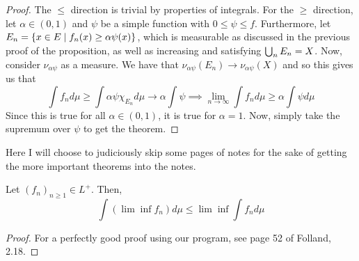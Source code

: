 \documentclass[11pt,leqno,oneside]{amsbook}
\numberwithin{thm}{section}
\begin{document}
\begin{proof}
  The \(\leq\) direction is trivial by properties of integrals. For
  the \(\geq\) direction, let \(\alpha \in (0,1)\) and \(\psi\) be 
  a simple function with \(0 \leq \psi \leq f\). Furthermore, let
  \(E_n = \{x \in E \mid f_n(x) \geq \alpha \psi(x)\}\), which is
  measurable as discussed in the previous proof of the proposition, as
  well as increasing and satisfying \(\bigcup_n E_n = X\). Now,
  consider \(\nu_{\alpha \psi}\) as a measure. We have that
  \(\nu_{\alpha \psi}(E_n) \to \nu_{\alpha \psi}(X)\) and so this
  gives us that \[
    \int f_n d\mu \geq \int \alpha \psi \chi_{E_n} d\mu \to \alpha
    \int \psi \implies \lim_{n \to \infty} \int f_n d\mu \geq \alpha
    \int \psi d\mu
  \]
  Since this is true for all \(\alpha \in (0,1)\), it is true for
  \(\alpha = 1\). Now, simply take the supremum over \(\psi\) to get
  the theorem.
\end{proof}
Here I will choose to judiciously skip some pages of notes for the
sake of getting the more important theorems into the notes.
\begin{lem}
  Let \((f_n)_{n \geq 1} \in L^+\). Then, \[
    \int (\lim \inf f_n) d\mu \leq \lim \inf \int f_n d\mu
  \]
\end{lem}
\begin{proof}
  For a perfectly good proof using our program, see page 52 of
  Folland, 2.18. 
\end{proof}
\end{document}
